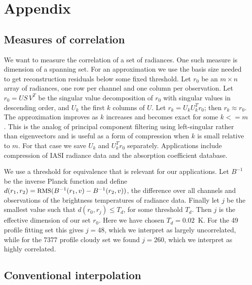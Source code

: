 \documentclass[journal]{IEEEtran}
\begin{document}
\section{Appendix}
\label{append}

\subsection{Measures of correlation}

We want to measure the correlation of a set of radiances.  One such
measure is dimension of a spanning set.  For an approximation we use
the basis size needed to get reconstruction residuals below some
fixed threshold.  Let $r_0$ be an $m \times n$ array of radiances,
one row per channel and one column per observation.  Let $r_0 = U
S\,V^T$ be the singular value decomposition of $r_0$ with singular
values in descending order, and $U_k$ the first $k$ columns of $U$.
Let $r_k = U_k U_k^T r_0$; then $r_k \approx r_0$.  The
approximation improves as $k$ increases and becomes exact for some
$k <= m$.  This is the analog of principal component filtering using
left-singular rather than eigenvectors and is useful as a form of
compression when $k$ is small relative to $m$.  For that case we
save $U_k$ and $U_k^T r_0$ separately.  Applications include
compression of IASI radiance data and the {\kcarta} absorption
coefficient database.

We use a threshold for equivalence that is relevant for our
applications.  Let $B^{-1}$ be the inverse Planck function and
define $d(r_1, r_2) = \mbox{\small RMS}(B^{-1}(r_1, v) - B^{-1}(r_2, v))$, the
{\rms} difference over all channels and observations of the
brightness temperatures of radiance data.  Finally let $j$ be the
smallest value such that $d(r_0, r_j) \le T_d$, for some threshold
$T_d$.  Then $j$ is the effective dimension of our set $r_0$.  Here
we have chosen $T_d = 0.02$~K.  For the 49 profile fitting set this
gives $j=48$, which we interpret as largely uncorrelated, while for
the 7377 profile cloudy set we found $j=260$, which we interpret as
highly correlated.

\subsection{Conventional interpolation}
\label{interp}
\end{document}
